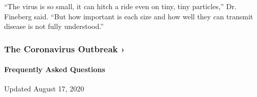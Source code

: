 ``The virus is so small, it can hitch a ride even on tiny, tiny
particles,'' Dr. Fineberg said. ``But how important is each size and how
well they can transmit disease is not fully understood.''

\href{https://www.nytimes.com/news-event/coronavirus?action=click\&pgtype=Article\&state=default\&region=MAIN_CONTENT_3\&context=storylines_faq}{}

\hypertarget{the-coronavirus-outbreak-}{%
\subsubsection{The Coronavirus Outbreak
›}\label{the-coronavirus-outbreak-}}

\hypertarget{frequently-asked-questions}{%
\paragraph{Frequently Asked
Questions}\label{frequently-asked-questions}}

Updated August 17, 2020

